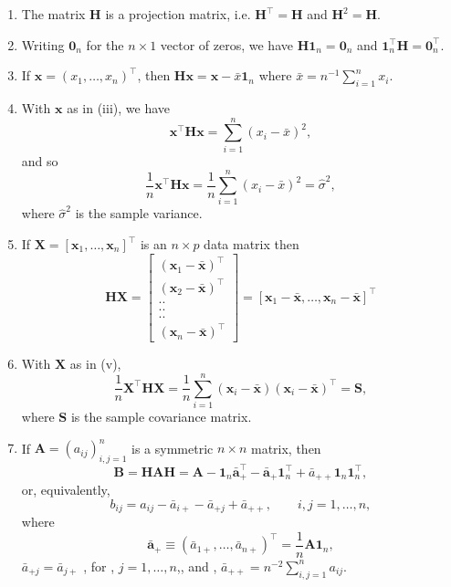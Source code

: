 \documentclass[]{book}
\providecommand{\tightlist}{%
  \setlength{\itemsep}{0pt}\setlength{\parskip}{0pt}}
\theoremstyle{definition}
\theoremstyle{definition}
\theoremstyle{definition}
\theoremstyle{remark}
\begin{document}
\begin{enumerate}
\def\labelenumi{\arabic{enumi}.}
\tightlist
\item
  The matrix \(\boldsymbol H\) is a projection matrix, i.e. \(\boldsymbol H^\top =\boldsymbol H\) and \(\boldsymbol H^2=\boldsymbol H\).
\item
  Writing \({\mathbf 0}_n\) for the \(n \times 1\) vector of zeros, we have
  \(\boldsymbol H{\mathbf 1}_n={\mathbf 0}_n\) and \({\mathbf 1}_n^\top \boldsymbol H={\mathbf 0}_n^\top.\)
\item
  If \(\boldsymbol x=(x_1, \ldots , x_n)^\top\), then \(\boldsymbol H\boldsymbol x= \boldsymbol x- \bar{x}{\mathbf 1}_n\) where \(\bar{x}=n^{-1}\sum_{i=1}^n x_i\).
\item
  With \(\boldsymbol x\) as in (iii), we have
  \[
  \boldsymbol x^\top \boldsymbol H\boldsymbol x= \sum_{i=1}^n (x_i-\bar{x})^2,
  \]
  and so
  \[
  \frac{1}{n}\boldsymbol x^\top \boldsymbol H\boldsymbol x=\frac{1}{n}\sum_{i=1}^n (x_i-\bar{x})^2 = \hat{\sigma}^2,
  \]
  where \(\hat{\sigma}^2\) is the sample variance.
\item
  If \(\boldsymbol X=[\boldsymbol x_1, \ldots , \boldsymbol x_n]^\top\) is an \(n \times p\) data matrix then
  \[
  \boldsymbol H\boldsymbol X=\left[ \begin{array}{c}
  (\boldsymbol x_1-\bar{\boldsymbol x})^\top\\
  (\boldsymbol x_2 -\bar{\boldsymbol x})^\top\\
  ..\\
  ..\\
  ..\\
  (\boldsymbol x_n - \bar{\boldsymbol x})^\top
  \end{array}\right ]= [ \boldsymbol x_1 -\bar{\boldsymbol x}, \ldots , \boldsymbol x_n-\bar{\boldsymbol x}]^\top
  \]
\item
  With \(\boldsymbol X\) as in (v),
  \[
  \frac{1}{n}\boldsymbol X^\top \boldsymbol H\boldsymbol X=\frac{1}{n} \sum_{i=1}^n (\boldsymbol x_i -\bar{\boldsymbol x})(\boldsymbol x_i -\bar{\boldsymbol x})^\top =\boldsymbol S,
  \]
  where \(\boldsymbol S\) is the sample covariance matrix.
\item
  If \(\boldsymbol A=(a_{ij})_{i,j=1}^n\) is a symmetric \(n \times n\) matrix, then
  \[
  \boldsymbol B=\boldsymbol H\boldsymbol A\boldsymbol H= \boldsymbol A- {\mathbf 1}_n \bar{\boldsymbol a}_+^\top -\bar{\boldsymbol a}_+{\mathbf 1}_n^\top +\bar{a}_{++}{\mathbf 1}_n {\mathbf 1}_n^\top,
  \]
  or, equivalently,
  \[
  b_{ij}=a_{ij}-\bar{a}_{i+}-\bar{a}_{+j}+\bar{a}_{++}, \qquad i,j=1, \ldots , n,
  \]
  where
  \[
  \bar{\boldsymbol a}_{+}\equiv (\bar{a}_{1+}, \ldots , \bar{a}_{n+})^\top=\frac{1}{n}\boldsymbol A{\mathbf 1}_n,
  \]
  \(\bar{a}_{+j}=\bar{a}_{j+}\) , for , \(j=1, \ldots , n\),, and , \(\bar{a}_{++}=n^{-2}\sum_{i,j=1}^n a_{ij}\).
\end{enumerate}
\end{document}
